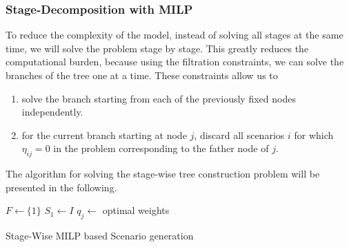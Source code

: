 \begin{comment}
  The size of this mathematical program is prohibitively large. Common orders of magnitude for the cardinality of the set of scenarios is well above 1000. The tree size is dictated by the choice of $n_c$ and the time represented by the number of time steps $n_s$ one wants to look into the future. Even for very short times like $n_c=4$ and five branches to each node, the number of nodes quickly goes up to $n_N=155$. This leads to an MILP with $n_N\cdot n_s=155,000$, which means that it is computationally intractable. The intractability is not only due to the sheer size, but to the combination with the fact that the problem has a very weak relaxation.
\end{comment}
\subsubsection{Stage-Decomposition with MILP}
To reduce the complexity of the model, instead of solving all stages at the same time, we will solve the problem stage by stage. This greatly reduces the computational burden, because using the filtration constraints, we can solve the branches of the tree one at a time. These constraints allow us to 
\begin{enumerate}
\item solve the branch starting from each of the previously fixed nodes independently.
\item for the current branch starting at node $j$, discard all scenarios $i$ for which $\eta_{ij}=0$ in the problem corresponding to the father node of $j$.
\end{enumerate}

The algorithm for solving the stage-wise tree construction problem will be presented in the following.
\begin{algorithm}
  $F \leftarrow \{1\}$
  $S_1 \leftarrow I$
  $q_j\leftarrow $ optimal weights 
  \caption{Stage-Wise MILP based Scenario generation}
  \label{alg:stage-wise-milp}
\end{algorithm}

